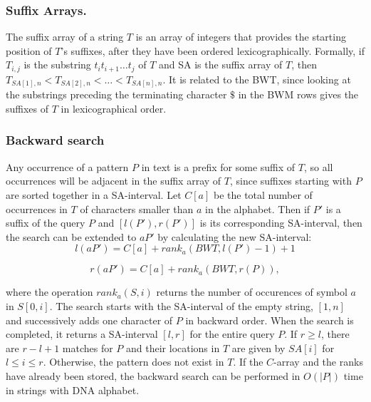 \documentclass[runningheads,a4paper]{llncs}
\begin{document}
\subsubsection{Suffix Arrays.} The suffix array of a string $T$ is an array of integers that provides the starting position of $T$'s suffixes, after they have been ordered lexicographically. Formally, if $T_{i,j}$ is the substring $t_i t_{i+1} \ldots t_j$ of $T$ and SA is the suffix array of $T$, then $T_{SA[1],n}<T_{SA[2],n}<\ldots <T_{SA[n],n}$. It is related to the BWT, since looking at the substrings preceding the terminating character $\$$ in the BWM rows gives the suffixes of $T$ in lexicographical order. 
\subsubsection{Backward search}
Any occurrence of a pattern $P$ in text is a prefix for some suffix of $T$, so all occurrences will be adjacent in the suffix array of $T$, since suffixes starting with $P$ are sorted together in a SA-interval. Let $C[a]$ be the total number of occurrences in $T$ of characters smaller than $a$ in the alphabet. Then if $P'$ is a suffix of the query $P$ and $[l(P'),r(P')]$ is its corresponding SA-interval, then the search can be extended to $aP'$ by calculating the new SA-interval:
\newline
\begin{equation} 
l(aP')=C[a]+rank_{a}(BWT,l(P')-1)+1 
\end{equation} 

\begin{equation} 
r(aP')=C[a]+rank_{a}(BWT,r(P)),
\end{equation}

where the operation $rank_a(S,i)$ returns the number of occurences of symbol $a$ in $S[0,i]$. The search starts with the SA-interval of the empty string, $[1,n]$ and successively adds one character of $P$ in backward order. When the search is completed, it returns a SA-interval $[l,r]$ for the entire query $P$. If $r \geq l$, there are $r-l+1$ matches for $P$ and their locations in $T$ are given by $SA[i]$ for $l \leq i \leq r$. Otherwise, the pattern does not exist in $T$. If the $C$-array and the ranks have already been stored, the backward search can be performed in $O(|P|)$ time in strings with DNA alphabet.
\end{document}
